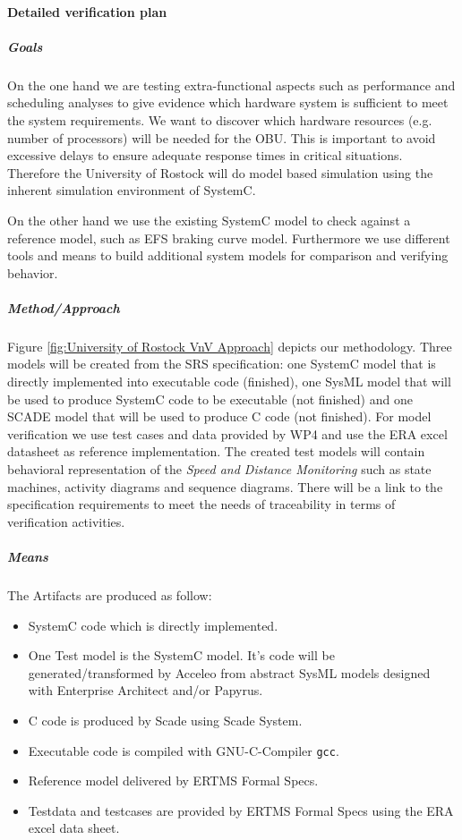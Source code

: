 \paragraph{Detailed verification plan}

\subparagraph{Goals}

On the one hand we are testing extra-functional aspects such as performance and scheduling analyses to give evidence which hardware system is sufficient to meet the system requirements. We want to discover which hardware resources (e.g. number of processors) will be needed for the OBU. This is important to avoid excessive delays to ensure adequate response times in critical situations. Therefore the University of Rostock will do model based simulation using the inherent simulation environment of SystemC.

On the other hand we use the existing SystemC model to check against a reference model, such as EFS braking curve model. Furthermore we use different tools and means to build additional system models for comparison and verifying behavior.

\subparagraph{Method/Approach}

Figure \ref{fig:University of Rostock VnV Approach} depicts our methodology. Three models will be created from the SRS
specification: one SystemC model that is directly implemented into executable code (finished), one SysML model that will be used to produce SystemC code to be executable (not finished) and one SCADE model that will be used to produce C code (not finished). For model verification we use test cases and data provided by WP4 and use the ERA excel datasheet as reference implementation. The created test models will contain behavioral representation of the \emph{Speed and Distance Monitoring} such as state machines, activity diagrams and sequence diagrams. There will be a link to the specification requirements to meet the needs of traceability in terms of verification activities.


\subparagraph{Means}

The Artifacts are produced as follow:
\begin{itemize}
\item SystemC code which is directly implemented.
\item One Test model is the SystemC model. It's code will be generated/transformed by Acceleo from abstract SysML models designed with Enterprise Architect and/or Papyrus.
\item C code is produced by Scade using Scade System.
\item Executable code is compiled with GNU-C-Compiler \texttt{gcc}.
\item Reference model delivered by ERTMS Formal Specs.
\item Testdata and testcases are provided by ERTMS Formal Specs using the ERA excel data sheet.
\end{itemize}


